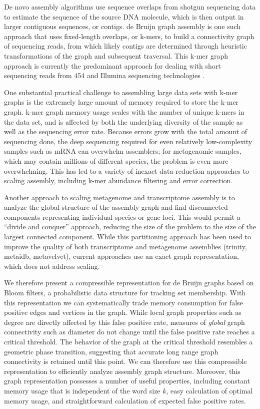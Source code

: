 \documentclass[12pt]{article} \usepackage{simplemargins}
\begin{document}
De novo assembly algorithms use sequence overlaps from shotgun
sequencing data to estimate the sequence of the source DNA molecule,
which is then output in larger contiguous sequences, or contigs.  de
Bruijn graph assembly is one such approach that uses fixed-length
overlaps, or k-mers, to build a connectivity graph of sequencing
reads, from which likely contigs are determined through heuristic
transformations of the graph and subsequent traversal.  This k-mer
graph approach is currently the predominant approach for dealing with
short sequencing reads from 454 and Illumina sequencing technologies
\cite{trinity, panda, pmid21273488, pmid20203603}.

One substantial practical challenge to assembling large data sets with
k-mer graphs is the extremely large amount of memory required to store
the k-mer graph.  k-mer graph memory usage scales with the number of
unique k-mers in the data set, and is affected by both the underlying
diversity of the sample as well as the sequencing error rate.  Because
errors grow with the total amount of sequencing done, the deep
sequencing required for even relatively low-complexity samples such as
mRNA can overwhelm assemblers; for metagenomic samples, which may
contain millions of different species, the problem is even more
overwhelming.  This has led to a variety of inexact data-reduction
approaches to scaling assembly, including k-mer abundance filtering
and error correction.

Another approach to scaling metagenome and transcriptome assembly is
to analyze the global structure of the assembly graph and find
disconnected components representing individual species or gene loci.
This would permit a ``divide and conquer'' approach, reducing the size
of the problem to the size of the largest connected component.  While
this partitioning approach has been used to improve the quality of
both transcriptome and metagenome assemblies (trinity, metaidb,
metavelvet), current approaches use an exact graph representation,
which does not address scaling.

We therefore present a compressible representation for de Bruijn
graphs based on Bloom filters\cite{bloom}, a probabilistic data
structure for tracking set membership.  With this representation we
can systematically trade memory consumption for false positive edges
and vertices in the graph.  While local graph properties such as
degree are directly affected by this false positive rate, measures of
{\em global} graph connectivity such as diameter do not change until
the false positive rate reaches a critical threshold.  The behavior of
the graph at the critical threshold resembles a geometric phase
transition, suggesting that accurate long range graph connectivity is
retained until this point.  We can therefore use this compressible
representation to efficiently analyze assembly graph structure.
Moreover, this graph representation possesses a number of useful
properties, including constant memory usage that is independent of the
word size $k$, easy calculation of optimal memory usage, and straightforward
calculation of expected false positive rates.
\end{document}
